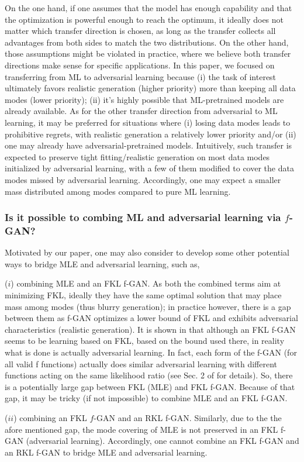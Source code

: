 \documentclass[letterpaper]{article} %
\begin{document}
 
On the one hand, if one assumes that the model has enough capability and that the optimization is powerful enough to reach the optimum, it ideally does not matter which transfer direction is chosen, as long as the transfer collects all advantages from both sides to match the two distributions. On the other hand, those assumptions might be violated in practice, where we believe both transfer directions make sense for specific applications. In this paper, we focused on transferring from ML to adversarial learning because (i) the task of interest ultimately favors realistic generation (higher priority) more than keeping all data modes (lower priority); (ii) it's highly possible that ML-pretrained models are already available. As for the other transfer direction from adversarial to ML learning, it may be preferred for situations where (i) losing data modes leads to prohibitive regrets, with realistic generation a relatively lower priority and/or (ii) one may already have adversarial-pretrained models. Intuitively, such transfer is expected to preserve tight fitting/realistic generation on most data modes initialized by adversarial learning, with a few of them modified to cover the data modes missed by adversarial learning. Accordingly, one may expect a smaller mass distributed among modes compared to pure ML learning. 

\subsubsection{Is it possible to combing ML and adversarial learning via $f$-GAN?}
Motivated by our paper, one may also consider to develop some other potential ways to bridge MLE and adversarial learning, such as, 

($i$) combining MLE and an FKL f-GAN. As both the combined terms aim at minimizing FKL, ideally they have the same optimal solution that may place mass among modes (thus blurry generation); in practice however, there is a gap between them as f-GAN optimizes a lower bound of FKL and exhibits adversarial characteristics (realistic generation). 
It is shown in \cite{li2019adversarial} that although an FKL f-GAN seems to be learning based on FKL, based on the bound used there, in reality what is done is actually adversarial learning. In fact, each form of the f-GAN (for all valid f functions) actually does similar adversarial learning with different functions acting on the same likelihood ratio (see Sec. 2 of \cite{li2019adversarial} for details). So, there is a potentially large gap between FKL (MLE) and FKL f-GAN. Because of that gap, it may be tricky (if not impossible) to combine MLE and an FKL f-GAN.

($ii$) combining an FKL $f$-GAN and an RKL f-GAN. Similarly, due to the the afore mentioned gap, the mode covering of MLE is not preserved in an FKL f-GAN (adversarial learning). Accordingly, one cannot combine an FKL f-GAN and an RKL f-GAN to bridge MLE and adversarial learning.
\end{document}
